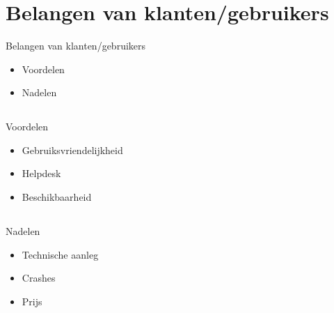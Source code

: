 \documentclass{beamer}
\begin{document}
\section[Klant]{Belangen van klanten/gebruikers}
\begin{frame}{Belangen van klanten/gebruikers}
    \begin{itemize}
        \item Voordelen 
        \item Nadelen
    \end{itemize} 
\end{frame}
    \subsection{}
    \begin{frame}{Voordelen}
        \begin{itemize}
            \item Gebruiksvriendelijkheid
            \item Helpdesk
            \item Beschikbaarheid
        \end{itemize}
    \end{frame}
            
    \subsection{}
    \begin{frame}{Nadelen}
        \begin{itemize}
            \item Technische aanleg
            \item Crashes
            \item Prijs
        \end{itemize}
    \end{frame}
    
    
\end{document}
